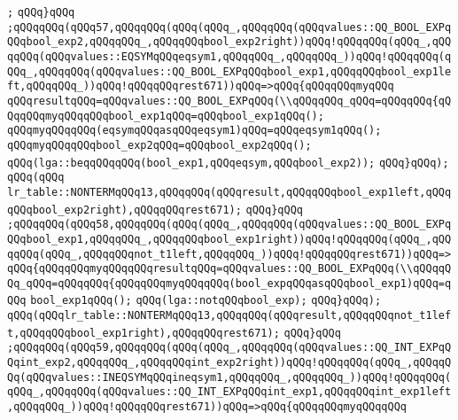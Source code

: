 \verb|;|\newline
\verb|qQQq}qQQq|\newline
\verb|;qQQqqQQq(qQQq57,qQQqqQQq(qQQq(qQQq_,qQQqqQQq(qQQqvalues::QQ_BOOL_EXPqQQqbool_exp2,qQQqqQQq_,qQQqqQQqbool_exp2right))qQQq!qQQqqQQq(qQQq_,qQQqqQQq(qQQqvalues::EQSYMqQQqeqsym1,qQQqqQQq_,qQQqqQQq_))qQQq!qQQqqQQq(qQQq_,qQQqqQQq(qQQqvalues::QQ_BOOL_EXPqQQqbool_exp1,qQQqqQQqbool_exp1left,qQQqqQQq_))qQQq!qQQqqQQqrest671))qQQq=>qQQq{qQQqqQQqmyqQQq|\newline
\verb|qQQqresultqQQq=qQQqvalues::QQ_BOOL_EXPqQQq(\\qQQqqQQq_qQQq=qQQqqQQq{qQQqqQQqmyqQQqqQQqbool_exp1qQQq=qQQqbool_exp1qQQq();|\newline
\verb|qQQqmyqQQqqQQq(eqsymqQQqasqQQqeqsym1)qQQq=qQQqeqsym1qQQq();|\newline
\verb|qQQqmyqQQqqQQqbool_exp2qQQq=qQQqbool_exp2qQQq();|\newline
\verb|qQQq(lga::beqqQQqqQQq(bool_exp1,qQQqeqsym,qQQqbool_exp2));|\newline
\verb|qQQq}qQQq);|\newline
\verb|qQQq(qQQq|\newline
\verb|lr_table::NONTERMqQQq13,qQQqqQQq(qQQqresult,qQQqqQQqbool_exp1left,qQQqqQQqbool_exp2right),qQQqqQQqrest671);|\newline
\verb|qQQq}qQQq|\newline
\verb|;qQQqqQQq(qQQq58,qQQqqQQq(qQQq(qQQq_,qQQqqQQq(qQQqvalues::QQ_BOOL_EXPqQQqbool_exp1,qQQqqQQq_,qQQqqQQqbool_exp1right))qQQq!qQQqqQQq(qQQq_,qQQqqQQq(qQQq_,qQQqqQQqnot_t1left,qQQqqQQq_))qQQq!qQQqqQQqrest671))qQQq=>qQQq{qQQqqQQqmyqQQqqQQqresultqQQq=qQQqvalues::QQ_BOOL_EXPqQQq(\\qQQqqQQq_qQQq=qQQqqQQq{qQQqqQQqmyqQQqqQQq(bool_expqQQqasqQQqbool_exp1)qQQq=qQQq|\newline
\verb|bool_exp1qQQq();|\newline
\verb|qQQq(lga::notqQQqbool_exp);|\newline
\verb|qQQq}qQQq);|\newline
\verb|qQQq(qQQqlr_table::NONTERMqQQq13,qQQqqQQq(qQQqresult,qQQqqQQqnot_t1left,qQQqqQQqbool_exp1right),qQQqqQQqrest671);|\newline
\verb|qQQq}qQQq|\newline
\verb|;qQQqqQQq(qQQq59,qQQqqQQq(qQQq(qQQq_,qQQqqQQq(qQQqvalues::QQ_INT_EXPqQQqint_exp2,qQQqqQQq_,qQQqqQQqint_exp2right))qQQq!qQQqqQQq(qQQq_,qQQqqQQq(qQQqvalues::INEQSYMqQQqineqsym1,qQQqqQQq_,qQQqqQQq_))qQQq!qQQqqQQq(qQQq_,qQQqqQQq(qQQqvalues::QQ_INT_EXPqQQqint_exp1,qQQqqQQqint_exp1left,qQQqqQQq_))qQQq!qQQqqQQqrest671))qQQq=>qQQq{qQQqqQQqmyqQQqqQQq|\newline
